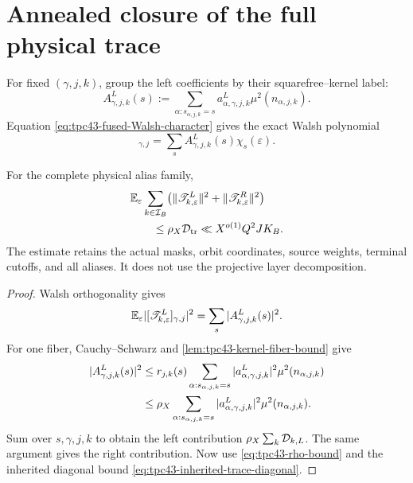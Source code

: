 \section{Annealed closure of the full physical trace}
\label{sec:tpc43-annealed-trace}

For fixed \((\gamma,j,k)\), group the left coefficients by their
squarefree--kernel label:
\begin{equation}
 A^L_{\gamma,j,k}(s)
 :=\sum_{\alpha:s_{\alpha,j,k}=s}
 a^L_{\alpha,\gamma,j,k}\mu^2(n_{\alpha,j,k}).
 \label{eq:tpc43-grouped-left-coefficient}
\end{equation}
Equation \eqref{eq:tpc43-fused-Walsh-character} gives the exact Walsh
polynomial
\begin{equation}
 [\mathscr T_{k,\varepsilon}^L]_{\gamma,j}
 =\sum_s A^L_{\gamma,j,k}(s)\chi_s(\varepsilon).
 \label{eq:tpc43-coordinate-Walsh-polynomial}
\end{equation}

\begin{theorem}
\label{thm:tpc43-annealed-trace}
For the complete physical alias family,
\begin{align}
 &\mathbb E_\varepsilon
 \sum_{k\in\mathcal I_B}
 \bigl(
  \|\mathscr T_{k,\varepsilon}^L\|^2
  +\|\mathscr T_{k,\varepsilon}^R\|^2
 \bigr)
 \notag\\
 &\qquad\le \rho_X\mathcal D_{\rm tr}
 \ll X^{o(1)}Q^2JK_B.
 \label{eq:tpc43-annealed-trace-bound}
\end{align}
The estimate retains the actual masks, orbit coordinates, source weights,
terminal cutoffs, and all aliases.  It does not use the projective layer
decomposition.
\end{theorem}

\begin{proof}
Walsh orthogonality gives
\begin{equation}
 \mathbb E_\varepsilon
 |[\mathscr T_{k,\varepsilon}^L]_{\gamma,j}|^2
 =\sum_s|A^L_{\gamma,j,k}(s)|^2.
 \label{eq:tpc43-one-coordinate-expectation}
\end{equation}
For one fiber, Cauchy--Schwarz and
\cref{lem:tpc43-kernel-fiber-bound} give
\begin{align}
 |A^L_{\gamma,j,k}(s)|^2
 &\le r_{j,k}(s)
 \sum_{\alpha:s_{\alpha,j,k}=s}
 |a^L_{\alpha,\gamma,j,k}|^2
 \mu^2(n_{\alpha,j,k})
 \notag\\
 &\le\rho_X
 \sum_{\alpha:s_{\alpha,j,k}=s}
 |a^L_{\alpha,\gamma,j,k}|^2
 \mu^2(n_{\alpha,j,k}).
 \label{eq:tpc43-fiber-Cauchy}
\end{align}
Sum over \(s,\gamma,j,k\) to obtain the left contribution
\(\rho_X\sum_k\mathcal D_{k,L}\).  The same argument gives the right
contribution.  Now use \eqref{eq:tpc43-rho-bound} and the inherited
diagonal bound \eqref{eq:tpc43-inherited-trace-diagonal}.
\end{proof}


